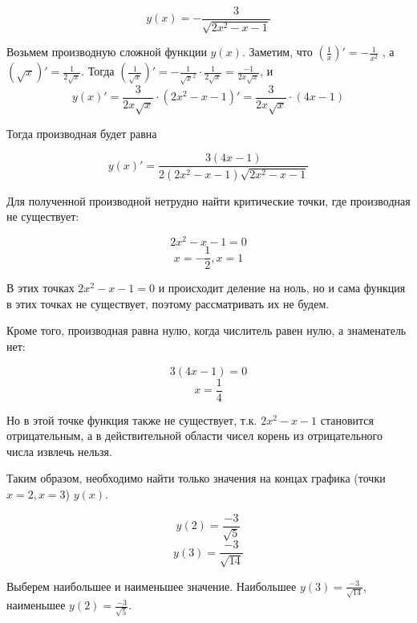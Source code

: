 \documentclass[a4paper]{article}
\begin{document}
\begin{equation}
	y(x)=-\frac{3}{\sqrt{2x^2-x-1}}
\end{equation}

Возьмем производную сложной функции $y(x)$. Заметим, что $(\frac{1}{x})'=-\frac{1}{x^2}$
, а $(\sqrt{x})'=\frac{1}{2\sqrt{x}}$. Тогда $(\frac{1}{\sqrt{x}})'=-\frac{1}{\sqrt{x}^2}\cdot\frac{1}{2\sqrt{x}}=\frac{-1}{2x\sqrt{x}}$, и 
\begin{equation}
	y(x)'=\frac{3}{2x\sqrt{x}}\cdot(2x^2-x-1)'=\frac{3}{2x\sqrt{x}}\cdot(4x-1)
\end{equation}

Тогда производная будет равна

\begin{equation}
	y(x)'=\frac{3(4x-1)}{2(2x^2-x-1)\sqrt{2x^2-x-1}}
\end{equation}

Для полученной производной нетрудно найти критические точки, где производная не существует: 

	$$2x^2-x-1=0$$
	$$x=-\frac{1}{2}, x=1$$

В этих точках $2x^2-x-1=0$ и происходит деление на ноль, но и сама функция в этих точках не существует, поэтому рассматривать их не будем.

Кроме того, производная равна нулю, когда числитель равен нулю, а знаменатель нет:

	$$3(4x-1)=0$$
	$$x=\frac{1}{4}$$

Но в этой точке функция также не существует, т.к. $2x^2-x-1$ становится отрицательным, а в действительной области чисел корень из отрицательного числа извлечь нельзя.

Таким образом, необходимо найти только значения на концах графика (точки $x=2, x=3$) $y(x)$.

$$y(2)=\frac{-3}{\sqrt{5}}$$
$$y(3)=\frac{-3}{\sqrt{14}}$$

Выберем наибольшее и наименьшее значение. Наибольшее $y(3)=\frac{-3}{\sqrt{14}}$, наименьшее $y(2)=\frac{-3}{\sqrt{5}}$.
\end{document}
